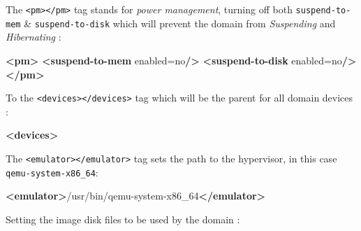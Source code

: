 \documentclass[
  14pt,
  english,
  a4paper,
]{scrreprt}
\newenvironment{Shaded}{}{}
\newcommand{\KeywordTok}[1]{\textcolor[rgb]{0.00,0.44,0.13}{\textbf{#1}}}
\newcommand{\NormalTok}[1]{#1}
\newcommand{\OtherTok}[1]{\textcolor[rgb]{0.00,0.44,0.13}{#1}}
\newcommand{\StringTok}[1]{\textcolor[rgb]{0.25,0.44,0.63}{#1}}
\begin{document}
The \texttt{\textless{}pm\textgreater{}\textless{}/pm\textgreater{}} tag
stands for \emph{power management}, turning off both
\texttt{suspend-to-mem} \& \texttt{suspend-to-disk} which will prevent
the domain from \emph{Suspending} and \emph{Hibernating} :

\begin{Shaded}
\begin{Highlighting}[]
  \KeywordTok{\textless{}pm\textgreater{}}
    \KeywordTok{\textless{}suspend{-}to{-}mem}\OtherTok{ enabled=}\StringTok{\textquotesingle{}no\textquotesingle{}}\KeywordTok{/\textgreater{}}
    \KeywordTok{\textless{}suspend{-}to{-}disk}\OtherTok{ enabled=}\StringTok{\textquotesingle{}no\textquotesingle{}}\KeywordTok{/\textgreater{}}
  \KeywordTok{\textless{}/pm\textgreater{}}
\end{Highlighting}
\end{Shaded}

To the
\texttt{\textless{}devices\textgreater{}\textless{}/devices\textgreater{}}
tag which will be the parent for all domain devices :

\begin{Shaded}
\begin{Highlighting}[]
  \KeywordTok{\textless{}devices\textgreater{}}
\end{Highlighting}
\end{Shaded}

The
\texttt{\textless{}emulator\textgreater{}\textless{}/emulator\textgreater{}}
tag sets the path to the hypervisor, in this case
\texttt{qemu-system-x86\_64}:

\begin{Shaded}
\begin{Highlighting}[]
   \KeywordTok{\textless{}emulator\textgreater{}}\NormalTok{/usr/bin/qemu{-}system{-}x86\_64}\KeywordTok{\textless{}/emulator\textgreater{}}
\end{Highlighting}
\end{Shaded}

Setting the image disk files to be used by the domain :
\end{document}
